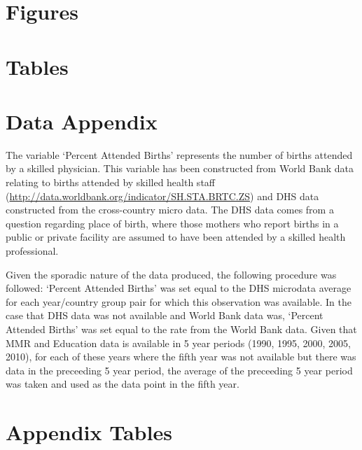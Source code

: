 \documentclass{article}[12pt,subeqn]
\begin{document}
\begin{spacing}{1.4}
\newpage
\section*{Figures}


\section*{Tables}





\newpage



\appendix
\section{Data Appendix}
\label{scn:dataappendix}
The variable `Percent Attended Births' represents the number of births attended by a skilled physician.  This variable has been constructed 
from World Bank data relating to births attended by skilled health staff (\url{http://data.worldbank.org/indicator/SH.STA.BRTC.ZS}) and DHS 
data constructed from the cross-country micro data.  The DHS data comes from a question regarding place of birth, where those mothers who 
report births in a public or private facility are assumed to have been attended by a skilled health professional.  

Given the sporadic nature of the data produced, the following procedure was followed: `Percent Attended Births' was set equal to the DHS microdata 
average for each year/country group pair for which this observation was available.  In the case that DHS data was not available and World
Bank data was, `Percent Attended Births' was set equal to the rate from the World Bank data.  Given that MMR and Education data is available in 5 year 
periods (1990, 1995, 2000, 2005, 2010), for each of these years where the fifth year was not available but there was data in the preceeding 
5 year period, the average of the preceeding 5 year period was taken and used as the data point in the fifth year.

\newpage
\section{Appendix Tables}
\label{scn:coutriesappendix}


\end{spacing}
\end{document}
